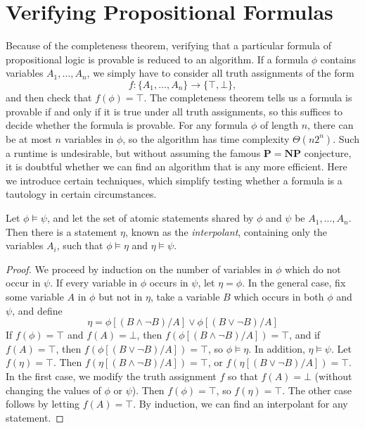 \section{Verifying Propositional Formulas}

Because of the completeness theorem, verifying that a particular formula of propositional logic is provable is reduced to an algorithm. If a formula $\phi$ contains variables $A_1, \dots, A_n$, we simply have to consider all truth assignments of the form
%
\[ f: \{ A_1, \dots, A_n \} \to \{ \top, \bot \}, \]
%
and then check that $f(\phi) = \top$. The completeness theorem tells us a formula is provable if and only if it is true under all truth assignments, so this suffices to decide whether the formula is provable. For any formula $\phi$ of length $n$, there can be at most $n$ variables in $\phi$, so the algorithm has time complexity $\Theta(n2^n)$. Such a runtime is undesirable, but without assuming the famous $\mathbf{P} = \mathbf{NP}$ conjecture, it is doubtful whether we can find an algorithm that is any more efficient. Here we introduce certain techniques, which simplify testing whether a formula is a tautology in certain circumstances.

\begin{theorem}
    Let $\phi \vDash \psi$, and let the set of atomic statements shared by $\phi$ and $\psi$ be $A_1, \dots, A_n$. Then there is a statement $\eta$, known as the \emph{interpolant}, containing only the variables $A_i$, such that $\phi \vDash \eta$ and $\eta \vDash \psi$.
\end{theorem}
\begin{proof}
    We proceed by induction on the number of variables in $\phi$ which do not occur in $\psi$. If every variable in $\phi$ occurs in $\psi$, let $\eta = \phi$. In the general case, fix some variable $A$ in $\phi$ but not in $\eta$, take a variable $B$ which occurs in both $\phi$ and $\psi$, and define
    \[ \eta = \phi[(B \wedge \neg B)/A] \vee \phi[(B \vee \neg B)/A] \]
    If $f(\phi) = \top$ and $f(A) = \bot$, then $f(\phi[(B \wedge \neg B)/A]) = \top$, and if $f(A) = \top$, then $f(\phi[(B \vee \neg B)/A]) = \top$, so $\phi \vDash \eta$. In addition, $\eta \vDash \psi$. Let $f(\eta) = \top$. Then $f(\eta[(B \wedge \neg B)/A]) = \top$, or $f(\eta[(B \vee \neg B)/A]) = \top$. In the first case, we modify the truth assignment $f$ so that $f(A) = \bot$ (without changing the values of $\phi$ or $\psi$). Then $f(\phi) = \top$, so $f(\eta) = \top$. The other case follows by letting $f(A) = \top$. By induction, we can find an interpolant for any statement.
\end{proof}


